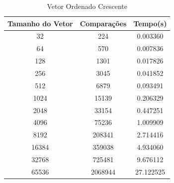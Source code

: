 \documentclass[12pt,a4paper,twoside]{report}
\begin{document}
\begin{table}[h]
  \centering
  \caption{Vetor Ordenado Crescente \label{tab:oc}}
  \begin{tabular}{ccc} \\\hline
  \textbf{Tamanho do Vetor} & \textbf{Comparações} & \textbf{Tempo(s)} \\\hline
  32                        & 224       		  & 0.003360\\\hline
  64                        & 570                  & 0.007836
\\\hline
  128                       & 1301       		  & 0.017826\\\hline
  256                       & 3045       		  & 0.041852
\\\hline
  512                       & 6879                 & 0.093491          \\\hline
  1024                      & 15139			  & 0.206329
\\\hline
  2048                      & 33154			  & 0.447251\\\hline
  4096                      & 75236			  & 1.009909         \\\hline
  8192                      & 208341			  & 2.714416
\\\hline
  16384                     & 359038 	             & 4.934060\\\hline
  32768                     & 725481 	             & 9.676112\\\hline
  65536                    & 2068944	             & 27.122525\\\hline
  \end{tabular}
\end{table}
\end{document}
